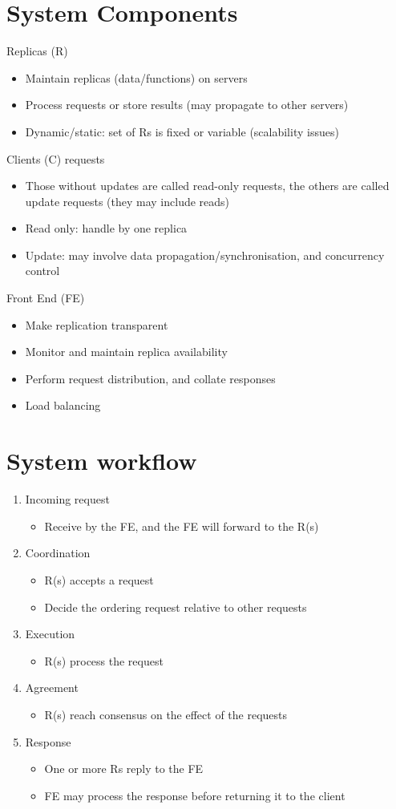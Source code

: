 \documentclass{article}[18pt]
\begin{document}
\section{System Components}
Replicas (R)
\begin{itemize}
	\item Maintain replicas (data/functions) on servers
	\item Process requests or store results (may propagate to other servers)
	\item Dynamic/static: set of Rs is fixed or variable (scalability issues)
\end{itemize}
Clients (C) requests
\begin{itemize}
	\item Those without updates are called read-only requests, the others are called update requests (they may include reads)
	\item Read only: handle by one replica
	\item Update: may involve data propagation/synchronisation, and concurrency control
\end{itemize}
Front End (FE)
\begin{itemize}
	\item Make replication transparent
	\item Monitor and maintain replica availability
	\item Perform request distribution, and collate responses
	\item Load balancing
\end{itemize}
\section{System workflow}
\begin{enumerate}
	\item Incoming request
	\begin{itemize}
		\item Receive by the FE, and the FE will forward to the R(s)
	\end{itemize}
	\item Coordination
	\begin{itemize}
		\item R(s) accepts a request
		\item Decide the ordering request relative to other requests
	\end{itemize}
	\item Execution
	\begin{itemize}
		\item R(s) process the request
	\end{itemize}
	\item Agreement
	\begin{itemize}
		\item R(s) reach consensus on the effect of the requests
	\end{itemize}
	\item Response
	\begin{itemize}
		\item One or more Rs reply to the FE
		\item FE may process the response before returning it to the client
	\end{itemize}
\end{enumerate}
\end{document}
